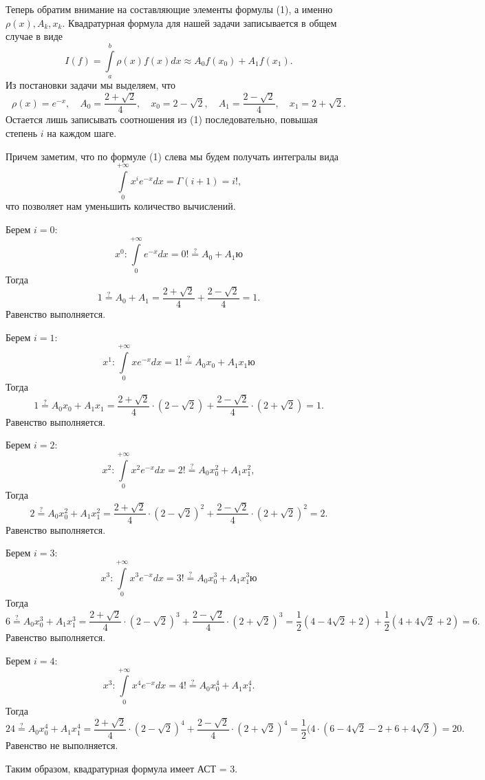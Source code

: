 \documentclass[a4paper, 12pt]{article}
\begin{document}
\begin{enumerate}
Теперь обратим внимание на составляющие элементы формулы (1), а именно $\rho(x), A_k, x_k$. Квадратурная формула для нашей задачи записывается в общем случае в виде
$$I(f) = \int\limits_a^b \rho(x)f(x)dx \approx A_0 f(x_0) + A_1 f(x_1).$$
Из постановки задачи мы выделяем, что $$\rho(x) = e^{-x},\quad A_0 =\dfrac{2+\sqrt2}{4},\quad x_0 =2-\sqrt2,\quad A_1 = \dfrac{2-\sqrt2}{4},\quad x_1 = 2+\sqrt2.$$
Остается лишь записывать соотношения из (1) последовательно, повышая степень $i$ на каждом шаге.

Причем заметим, что по формуле (1) слева мы будем получать интегралы вида $$\int\limits_0^{+\infty} x^i e^{-x} dx = \Gamma(i+1) = i!,$$ что позволяет нам уменьшить количество вычислений.

Берем $i=0$:
$$x^0 : \int\limits_0^{+\infty} e^{-x}dx=0! \overset{?}{=}  A_0 + A_1ю$$
Тогда $$1 \overset{?}{=} A_0 + A_1 = \dfrac{2+\sqrt2}{4} + \dfrac{2-\sqrt2}{4} = 1.$$
Равенство выполняется.

Берем $i=1$:
$$x^1 : \int\limits_0^{+\infty} xe^{-x}dx = 1!\overset{?}{=}  A_0x_0 + A_1x_1ю$$
Тогда $$1 \overset{?}{=} A_0x_0 + A_1x_1 = \dfrac{2+\sqrt2}{4}\cdot (2-\sqrt2) + \dfrac{2-\sqrt2}{4}\cdot (2+\sqrt2) = 1.$$
Равенство выполняется.

Берем $i=2$:
$$x^2 : \int\limits_0^{+\infty} x^2e^{-x}dx=2! \overset{?}{=}  A_0x_0^2 + A_1x_1^2,$$
Тогда $$2 \overset{?}{=} A_0x_0^2 + A_1x_1^2 = \dfrac{2+\sqrt2}{4}\cdot (2-\sqrt2)^2 + \dfrac{2-\sqrt2}{4}\cdot (2+\sqrt2)^2 = 2.$$
Равенство выполняется.

Берем $i=3$:
$$x^3 : \int\limits_0^{+\infty} x^3e^{-x}dx =3!\overset{?}{=}  A_0x_0^3 + A_1x_1^3ю$$
Тогда $$6 \overset{?}{=} A_0x_0^3 + A_1x_1^3 = \dfrac{2+\sqrt2}{4}\cdot (2-\sqrt2)^3 + \dfrac{2-\sqrt2}{4}\cdot (2+\sqrt2)^3 = \dfrac12(4-4\sqrt2 + 2) +\dfrac12(4+4\sqrt2 + 2) = 6.$$
Равенство выполняется.

Берем $i=4$:
$$x^3 : \int\limits_0^{+\infty} x^4e^{-x}dx=4! \overset{?}{=}  A_0x_0^4 + A_1x_1^4.$$
Тогда $$24 \overset{?}{=} A_0x_0^4 + A_1x_1^4 = \dfrac{2+\sqrt2}{4}\cdot (2-\sqrt2)^4 + \dfrac{2-\sqrt2}{4}\cdot (2+\sqrt2)^4 = \dfrac12(4\cdot (6-4\sqrt2 - 2 + 6+4\sqrt2) = 20.$$
Равенство не выполняется.

Таким образом, квадратурная формула имеет АСТ = 3.
	\end{enumerate}
\end{document}
